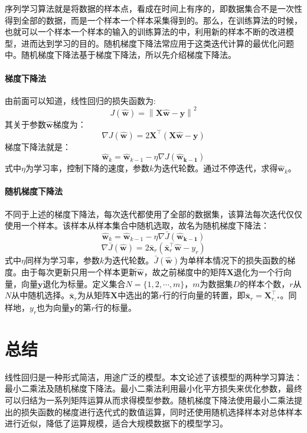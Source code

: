 \documentclass[12pt,a4paper,draft]{ctexart}
\begin{document}
序列学习算法就是将数据的样本点，看成在时间上有序的，即数据集合不是一次性得到全部的数据，而是一个样本一个样本采集得到的。那么，在训练算法的时候，也就可以一个样本一个样本的输入的训练算法的中，利用新的样本不断的改进模型，进而达到学习的目的。随机梯度下降法常应用于这类迭代计算的最优化问题中。随机梯度下降法基于梯度下降法，所以先介绍梯度下降法。

\paragraph{梯度下降法}
由前面可以知道，线性回归的损失函数为:
\[ J(\bm{\hat{w}})=\left \| \bm{X}\bm{\hat{w}}-\bm{y} \right \|^{2} \]
其关于参数$ \bm{\hat{w}} $梯度为：
\[ \nabla J(\bm{\hat{w}})=2\bm{X}^\top(\bm{X}\hat{\bm{w}}-\bm{y}) \]
梯度下降法就是：
\[ \bm{\hat{w}}_{k} = \bm{\hat{w}}_{k-1}- \eta \nabla J(\bm{\hat{w}_{k-1}}) \]
式中$\eta$为学习率，控制下降的速度，参数$ k $为迭代轮数。通过不停迭代，求得$ \bm{\hat{w}}_{k} $。
\paragraph{随机梯度下降法}
不同于上述的梯度下降法，每次迭代都使用了全部的数据集，该算法每次迭代仅仅使用一个样本。该样本从样本集合中随机选取，故名为随机梯度下降法：
\[\bm{\hat{w}}_{k} = \bm{\hat{w}}_{k-1}- \eta \nabla\bar{J}(\bm{\hat{w}_{k-1}})\]  
\[\nabla\bar{J}(\bm{\hat{w}})=2 \bar{\bm{x}}_{r}(\bar{\bm{x}}_{r}^\top\bm{\hat{w}} - y_{r}) \] 
式中$\eta$同样为学习率，参数$ k $为迭代轮数。$ \bar{J}(\bm{\hat{w}}) $为单样本情况下的损失函数的梯度。由于每次更新只用一个样本更新$ \bm{\hat{w}} $，故之前梯度中的矩阵$ \bm{X} $退化为一个行向量，向量$ \bm{y} $退化为标量。定义集合$ N=\{1,2,\cdots,m\} $，$ m $为数据集$ D $的样本个数，$ r $从$ N $从中随机选择。$ \bar{\bm{x}}_{r} $为从矩阵$ \bm{X} $中选出的第$ r $行的行向量的转置，即$ \bar{\bm{x}}_{r}=\bm{X}_{r,*}^\top $。同样地，$ y_{r} $也为向量$ \bm{y} $的第$ r $行的标量。
\section{总结}
线性回归是一种形式简洁，用途广泛的模型。本文论述了该模型的两种学习算法：最小二乘法及随机梯度下降法。最小二乘法利用最小化平方损失来优化参数，最终可以归结为一系列矩阵运算从而求得模型参数。随机梯度下降法使用最小二乘法提出的损失函数的梯度进行迭代式的数值运算，同时还使用随机选择样本对总体样本进行近似，降低了运算规模，适合大规模数据下的模型学习。
\end{document}
